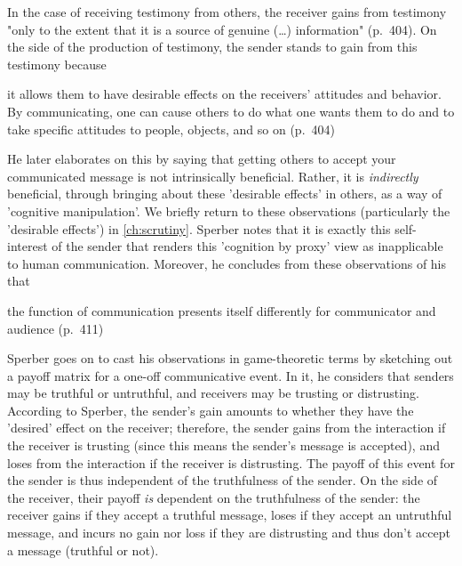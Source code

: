 In the case of receiving testimony from others, the receiver gains from testimony "only to the extent that it is a source of genuine (\ldots) information" (p.~404).
On the side of the production of testimony, the sender stands to gain from this testimony because
\begin{quoting}
    it allows them to have desirable effects on the receivers' attitudes and behavior. By communicating, one can cause others to do what one wants them to do and to take specific attitudes to people, objects, and so on
    \hfill (p.~404)
\end{quoting}
He later elaborates on this by saying that getting others to accept your communicated message is not intrinsically beneficial. Rather, it is \emph{indirectly} beneficial, through bringing about these 'desirable effects' in others, as a way of 'cognitive manipulation'.
We briefly return to these observations (particularly the 'desirable effects') in \cref{ch:scrutiny}.
Sperber notes that it is exactly this self-interest of the sender that renders this 'cognition by proxy' view as inapplicable to human communication.
Moreover, he concludes from these observations of his that
\begin{quoting}
    the function of communication presents itself differently for communicator and audience
    \hfill (p.~411)
\end{quoting}

Sperber goes on to cast his observations in game-theoretic terms by sketching out a payoff matrix for a one-off communicative event. In it, he considers that senders may be truthful or untruthful, and receivers may be trusting or distrusting. According to Sperber, the sender's gain amounts to whether they have the 'desired' effect on the receiver; therefore, the sender gains from the interaction if the receiver is trusting (since this means the sender's message is accepted), and loses from the interaction if the receiver is distrusting. The payoff of this event for the sender is thus independent of the truthfulness of the sender. On the side of the receiver, their payoff \emph{is} dependent on the truthfulness of the sender: the receiver gains if they accept a truthful message, loses if they accept an untruthful message, and incurs no gain nor loss if they are distrusting and thus don't accept a message (truthful or not).

